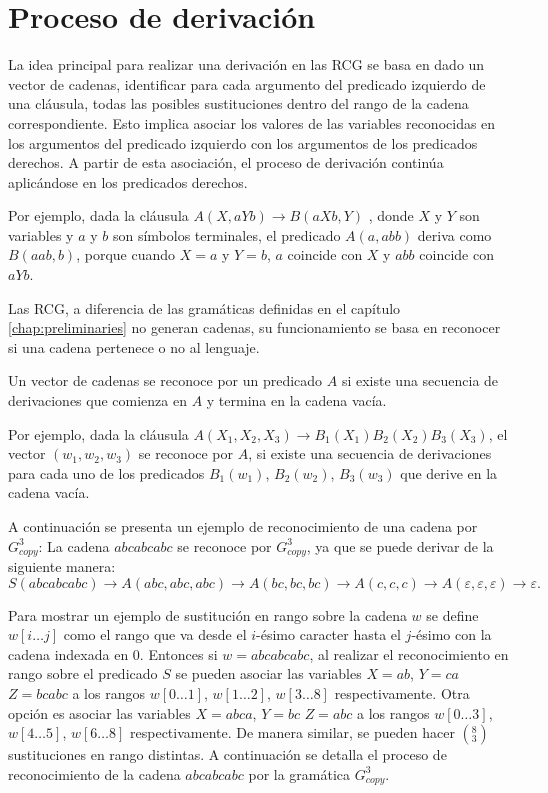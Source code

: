 \documentclass[12pt]{article}
\begin{document}
\section{Proceso de derivación}

La idea principal para realizar una derivación en las RCG se basa en dado un vector de cadenas, identificar para cada argumento del predicado izquierdo de una cláusula, todas las posibles sustituciones dentro del rango de la cadena correspondiente.  Esto implica asociar los valores de las variables reconocidas en los argumentos del predicado izquierdo con los argumentos de los predicados derechos. A partir de esta asociación, el proceso de derivación continúa aplicándose en los predicados derechos.

Por ejemplo, dada la cláusula $A(X,aYb)\to B(aXb,Y)$ , donde $X$ y $Y$ son variables y $a$ y $b$ son
símbolos terminales, el predicado $A(a,abb)$ deriva como $B(aab,b)$, porque cuando $ X=a$ y $Y=b$,
$a$ coincide con $X$ y $abb$ coincide con $aYb$.

Las RCG, a diferencia de las gramáticas definidas en el capítulo \ref{chap:preliminaries} no generan cadenas,
su funcionamiento se basa en reconocer si una cadena pertenece o no al lenguaje.

Un vector de cadenas se reconoce por un predicado $A$ si existe una secuencia de derivaciones que comienza en
$A$ y termina en la cadena vacía.

Por ejemplo, dada la cláusula $A(X_1,X_2,X_3)\to B_1(X_1)B_2(X_2)B_3(X_3)$, el vector $(w_1,w_2,w_3)$
se reconoce por $A$, si existe una secuencia de derivaciones para cada
uno de los predicados $B_1(w_1)$, $B_2(w_2)$, $B_3(w_3)$ que derive en la cadena vacía.

A continuación se presenta un ejemplo de reconocimiento de una cadena por $G^3_{copy}$: La cadena $abcabcabc$ se reconoce por $G^3_{copy}$, ya que se puede derivar de la siguiente manera:
$$S(abcabcabc)\to A(abc,abc,abc)\to A(bc,bc,bc)\to A(c,c,c)\to A(\varepsilon,\varepsilon,\varepsilon)\to \varepsilon.$$

Para mostrar un ejemplo de sustitución en rango sobre la cadena $w$ se define $w[i\dots j]$ como el rango que
va desde el $i$-ésimo caracter hasta el $j$-ésimo con la cadena indexada en 0. Entonces si $w=abcabcabc$,
al realizar el reconocimiento en rango sobre el predicado $S$ se pueden asociar las variables $X=ab$,
$Y=ca$ $Z=bcabc$ a los rangos $w[0\dots 1]$, $w[1\dots 2]$, $w[3\dots 8]$ respectivamente. Otra opción es
asociar las variables $X=abca$, $Y=bc$ $Z=abc$ a los rangos $w[0\dots 3]$, $w[4\dots 5]$, $w[6\dots 8]$
respectivamente. De manera similar, se pueden hacer $(^8_3)$ sustituciones en rango distintas. A
continuación se detalla el proceso de reconocimiento de la cadena $abcabcabc$ por la gramática $G^3_{copy}$.
\end{document}
